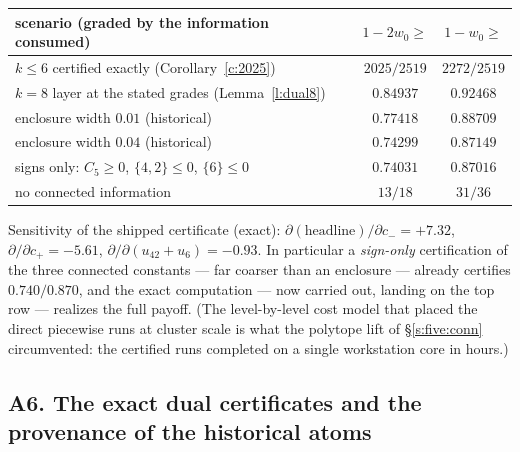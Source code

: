 \documentclass[11pt]{article}
\numberwithin{equation}{section}
\theoremstyle{definition}
\theoremstyle{remark}
\begin{document}
\begin{center}
\begin{tabular}{lcc}
scenario (graded by the information consumed) &
$1-2w_0\ge$ & $1-w_0\ge$\\
\hline
$k\le6$ certified exactly (Corollary~\ref{c:2025}) &
$2025/2519$ & $2272/2519$\\
$k=8$ layer at the stated grades (Lemma~\ref{l:dual8}) &
$0.84937$ & $0.92468$\\
enclosure width $0.01$ (historical) & $0.77418$ & $0.88709$\\
enclosure width $0.04$ (historical) & $0.74299$ & $0.87149$\\
signs only: $C_5\ge0$, $\{4,2\}\le0$, $\{6\}\le0$ &
$0.74031$ & $0.87016$\\
no connected information & $13/18$ & $31/36$\\
\end{tabular}
\end{center}

\noindent Sensitivity of the shipped certificate (exact):
$\partial(\text{headline})/\partial c_-=+7.32$,
$\partial/\partial c_+=-5.61$,
$\partial/\partial(u_{42}{+}u_6)=-0.93$. In particular a
\emph{sign-only} certification of the three connected constants
--- far coarser than an enclosure --- already certifies
$0.740/0.870$, and the exact computation --- now carried out,
landing on the top row --- realizes the full payoff. (The
level-by-level cost model that placed the direct piecewise
runs at cluster scale is what the polytope lift of
\S\ref{s:five:conn} circumvented: the certified runs completed
on a single workstation core in hours.)

\subsection*{A6. The exact dual certificates and the
provenance of the historical atoms}
\end{document}
